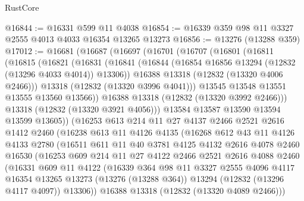 \begin{lexlean}{RustCore}
\begin{coremodule}
@16844 := @16331 @599 @11 @4038
@16854 := @16339 @359 @98 @11 @3327 @2555 @4013 @4033 @16354 @13265 @13273
@16856 := @13276 (@13288 @359)
@17012 := @16681
    (@16687
      (@16697
        (@16701
          (@16707
            (@16801
              (@16811
                (@16815
                  (@16821
                    (@16831
                      (@16841
                        (@16844 (@16854 @16856 @13294 (@12832 (@13296 @4033 @4014)) @13306))
                        @16388
                        @13318
                        (@12832 (@13320 @4006 @2466)))
                      @13318
                      (@12832 (@13320 @3996 @4041)))
                    @13545
                    @13548
                    @13551
                    @13555
                    @13560
                    @13566))
                @16388
                @13318
                (@12832 (@13320 @3992 @2466)))
              @13318
              (@12832 (@13320 @3921 @4056)))
            @13584
            @13587
            @13590
            @13594
            @13599
            @13605))
        (@16253
          @613
          @214
          @11
          @27
          @4137
          @2466
          @2521
          @2616
          @1412
          @2460
          (@16238
            @613
            @11
            @4126
            @4135
            (@16268
              @612
              @43
              @11
              @4126
              @4133
              @2780
              (@16511
                @611
                @11
                @40
                @3781
                @4125
                @4132
                @2616
                @4078
                @2460
                @16530
                (@16253
                  @609
                  @214
                  @11
                  @27
                  @4122
                  @2466
                  @2521
                  @2616
                  @4088
                  @2460
                  (@16331
                    @609
                    @11
                    @4122
                    (@16339
                      @364
                      @98
                      @11
                      @3327
                      @2555
                      @4096
                      @4117
                      @16354
                      @13265
                      @13273
                      (@13276 (@13288 @364))
                      @13294
                      (@12832 (@13296 @4117 @4097))
                      @13306))
                  @16388
                  @13318
                  (@12832 (@13320 @4089 @2466)))

\end{coremodule}
\end{lexlean}
